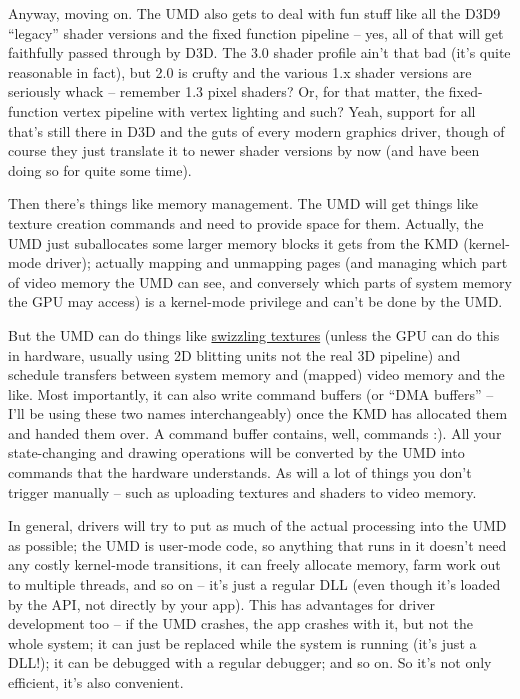 \documentclass[12pt]{article}
\begin{document}
Anyway, moving on.
The UMD also gets to deal with fun stuff like all the D3D9 “legacy” shader versions and the fixed function pipeline – yes, all of that will get faithfully passed through by D3D.
The 3.0 shader profile ain’t that bad (it’s quite reasonable in fact), but 2.0 is crufty and the various 1.x shader versions are seriously whack – remember 1.3 pixel shaders? Or, for that matter, the fixed-function vertex pipeline with vertex lighting and such? Yeah, support for all that’s still there in D3D and the guts of every modern graphics driver, though of course they just translate it to newer shader versions by now (and have been doing so for quite some time).

Then there’s things like memory management.
The UMD will get things like texture creation commands and need to provide space for them.
Actually, the UMD just suballocates some larger memory blocks it gets from the KMD (kernel-mode driver); actually mapping and unmapping pages (and managing which part of video memory the UMD can see, and conversely which parts of system memory the GPU may access) is a kernel-mode privilege and can’t be done by the UMD.

But the UMD can do things like \href{https://fgiesen.wordpress.com/2011/01/17/texture-tiling-and-swizzling/}{swizzling textures} (unless the GPU can do this in hardware, usually using 2D blitting units not the real 3D pipeline) and schedule transfers between system memory and (mapped) video memory and the like.
Most importantly, it can also write command buffers (or “DMA buffers” – I’ll be using these two names interchangeably) once the KMD has allocated them and handed them over.
A command buffer contains, well, commands :).
All your state-changing and drawing operations will be converted by the UMD into commands that the hardware understands.
As will a lot of things you don’t trigger manually – such as uploading textures and shaders to video memory.

In general, drivers will try to put as much of the actual processing into the UMD as possible; the UMD is user-mode code, so anything that runs in it doesn’t need any costly kernel-mode transitions, it can freely allocate memory, farm work out to multiple threads, and so on – it’s just a regular DLL (even though it’s loaded by the API, not directly by your app).
This has advantages for driver development too – if the UMD crashes, the app crashes with it, but not the whole system; it can just be replaced while the system is running (it’s just a DLL!); it can be debugged with a regular debugger; and so on.
So it’s not only efficient, it’s also convenient.
\end{document}
